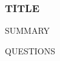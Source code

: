 %
%

\begin{frame}
  \frametitle{{{TITLE}}}
  \vskip0.2cm

  {{SUMMARY}}

  \vskip0.25cm

  {{QUESTIONS}}
\end{frame}

%
